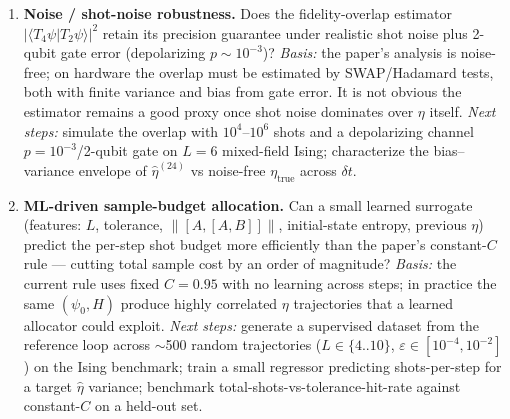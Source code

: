 \begin{enumerate}
\item \textbf{Noise / shot-noise robustness.}
Does the fidelity-overlap estimator $|\langle T_4\psi | T_2\psi\rangle|^2$ retain its precision guarantee under realistic shot noise plus 2-qubit gate error (depolarizing $p\sim 10^{-3}$)?
\emph{Basis:} the paper's analysis is noise-free; on hardware the overlap must be estimated by SWAP/Hadamard tests, both with finite variance and bias from gate error. It is not obvious the estimator remains a good proxy once shot noise dominates over $\eta$ itself.
\emph{Next steps:} simulate the overlap with $10^{4}$--$10^{6}$ shots and a depolarizing channel $p{=}10^{-3}$/2-qubit gate on $L{=}6$ mixed-field Ising; characterize the bias--variance envelope of $\hat{\eta}^{(24)}$ vs noise-free $\eta_\text{true}$ across $\delta t$.

\item \textbf{ML-driven sample-budget allocation.}
Can a small learned surrogate (features: $L$, tolerance, $\|[A,[A,B]]\|$, initial-state entropy, previous $\eta$) predict the per-step shot budget more efficiently than the paper's constant-$C$ rule --- cutting total sample cost by an order of magnitude?
\emph{Basis:} the current rule uses fixed $C{=}0.95$ with no learning across steps; in practice the same $(\psi_0, H)$ produce highly correlated $\eta$ trajectories that a learned allocator could exploit.
\emph{Next steps:} generate a supervised dataset from the reference loop across $\sim$500 random trajectories ($L\in\{4..10\}$, $\varepsilon\in[10^{-4},10^{-2}]$) on the Ising benchmark; train a small regressor predicting shots-per-step for a target $\hat{\eta}$ variance; benchmark total-shots-vs-tolerance-hit-rate against constant-$C$ on a held-out set.

\end{enumerate}
